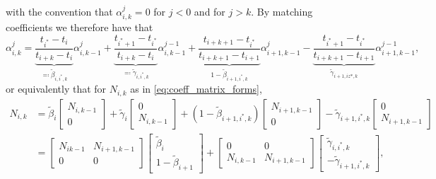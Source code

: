 with the convention that $\alpha^{j}_{i, k} = 0$ for $j < 0$ and for $j > k$. By matching coefficients we therefore have that
\begin{equation}
  \alpha_{i, k}^j = \underbrace{\frac{t_{i^*} - t_i}{t_{i+k} - t_i}}_{\eqcolon \tilde \beta_{i, i^*, k}} \alpha_{i, k-1}^{j} + \underbrace{\frac{t_{i^*+1}-t_{i^*}} {t_{i+k} - t_{i}}}_{\eqcolon\tilde  \gamma_{i, i^*, k}}  \alpha^{j-1}_{i, k-1} + \underbrace{\frac{t_{i+k+1}-t_{i^*}}{t_{i+k+1} - t_{i+1}}}_{1 - \tilde \beta_{i+1, i^*,  k}} \alpha^j_{i+1,k-1} - \underbrace{\frac{t_{i^*+1}-t_{i^*}}{t_{i+k+1} - t_{i+1}}}_{\tilde \gamma_{i+1, iz*, k}} \alpha^{j-1}_{i+1, k-1},
\end{equation}
or equivalently that for $N_{i, k}$ as in \eqref{eq:coeff_matrix_forms},
\begin{equation}
  \begin{aligned}
    N_{i,k} & = \tilde \beta_i \begin{bmatrix} N_{i, k-1} \\ 0 \end{bmatrix} + \tilde \gamma_i \begin{bmatrix}
      0 \\ N_{i, k-1}  \end{bmatrix} + (1 - \tilde \beta_{i+1, i^*, k}) \begin{bmatrix}
      N_{i+1, k-1} \\ 0  \end{bmatrix} - \tilde \gamma_{i+1, i^*, k} \begin{bmatrix}  0 \\ N_{i+1, k-1}  \end{bmatrix} \\
            & = \begin{bmatrix} N_{i k-1} & N_{i+1, k-1} \\ 0 & 0 \end{bmatrix} \begin{bmatrix} \tilde \beta_i \\ 1 - \tilde \beta_{i+1} \end{bmatrix} + \begin{bmatrix} 0 & 0 \\ N_{i, k-1} & N_{i+1, k-1} \end{bmatrix} \begin{bmatrix} \tilde \gamma_{i, i^*, k} \\ -\tilde \gamma_{i+1, i^*, k} \end{bmatrix},
  \end{aligned}
\end{equation}
